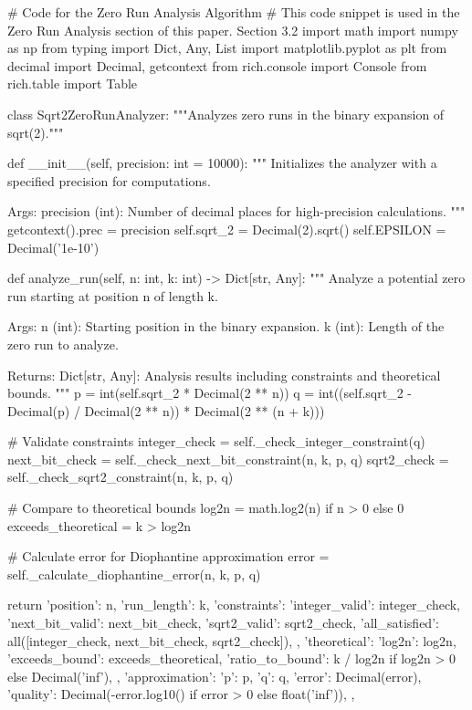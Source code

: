 
# Code for the Zero Run Analysis Algorithm
# This code snippet is used in the Zero Run Analysis section of this paper. Section 3.2
import math
import numpy as np
from typing import Dict, Any, List
import matplotlib.pyplot as plt
from decimal import Decimal, getcontext
from rich.console import Console
from rich.table import Table

class Sqrt2ZeroRunAnalyzer:
    """Analyzes zero runs in the binary expansion of sqrt(2)."""

    def __init__(self, precision: int = 10000):
        """
        Initializes the analyzer with a specified precision for computations.

        Args:
            precision (int): Number of decimal places for high-precision calculations.
        """
        getcontext().prec = precision
        self.sqrt_2 = Decimal(2).sqrt()
        self.EPSILON = Decimal('1e-10')

    def analyze_run(self, n: int, k: int) -> Dict[str, Any]:
        """
        Analyze a potential zero run starting at position n of length k.

        Args:
            n (int): Starting position in the binary expansion.
            k (int): Length of the zero run to analyze.

        Returns:
            Dict[str, Any]: Analysis results including constraints and theoretical bounds.
        """
        p = int(self.sqrt_2 * Decimal(2 ** n))
        q = int((self.sqrt_2 - Decimal(p) / Decimal(2 ** n)) * Decimal(2 ** (n + k)))

        # Validate constraints
        integer_check = self._check_integer_constraint(q)
        next_bit_check = self._check_next_bit_constraint(n, k, p, q)
        sqrt2_check = self._check_sqrt2_constraint(n, k, p, q)

        # Compare to theoretical bounds
        log2n = math.log2(n) if n > 0 else 0
        exceeds_theoretical = k > log2n

        # Calculate error for Diophantine approximation
        error = self._calculate_diophantine_error(n, k, p, q)

        return {
            'position': n,
            'run_length': k,
            'constraints': {
                'integer_valid': integer_check,
                'next_bit_valid': next_bit_check,
                'sqrt2_valid': sqrt2_check,
                'all_satisfied': all([integer_check, next_bit_check, sqrt2_check]),
            },
            'theoretical': {
                'log2n': log2n,
                'exceeds_bound': exceeds_theoretical,
                'ratio_to_bound': k / log2n if log2n > 0 else Decimal('inf'),
            },
            'approximation': {
                'p': p,
                'q': q,
                'error': Decimal(error),
                'quality': Decimal(-error.log10() if error > 0 else float('inf')),
            },
        }

